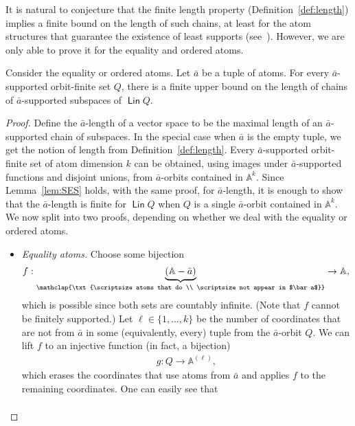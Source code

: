 \documentclass[10pt,a4paper]{amsart}
\numberwithin{equation}{section}
\newcommand{\set}[1]{\{#1\}}
\newcommand{\myunderbrace}[2]{\underbrace{#1}_{\mathclap{\txt{\scriptsize #2}}}}
\newcommand{\atoms}{\mathbb A}
\DeclareMathOperator{\lin}{\mathsf{Lin}}
\begin{document}
It is natural to conjecture that the finite length property (Definition~\ref{def:length}) implies a finite bound on the length of such chains, at least for the atom structures that guarantee the existence of least supports (see~\cite[Section 9]{BKL14}). However, we are only able to prove it for the equality and ordered atoms.


\begin{theorem}\label{cor:finsup-length}
	Consider the equality or ordered atoms. Let $\bar a$ be a tuple of atoms.  For every $\bar a$-supported orbit-finite set $Q$, there is a finite upper bound on the length of chains of $\bar a$-supported subspaces of $\lin Q$.
\end{theorem}

\begin{proof}
	Define the $\bar a$-length of a vector space to be the maximal length of an $\bar a$-supported chain of subspaces. In the special case when $\bar a$ is the empty tuple, we get the notion of length from Definition~\ref{def:length}. 
	Every $\bar a$-supported orbit-finite set of atom dimension $k$ can be obtained, using images under $\bar a$-supported functions and disjoint unions, from $\bar a$-orbits contained in $\atoms^k$. Since 
	 Lemma~\ref{lem:SES} holds, with the same proof,  for $\bar a$-length, it is enough to show that the $\bar a$-length is finite for $\lin Q$ when $Q$ is a single $\bar a$-orbit contained in $\atoms^k$. We now split into two proofs, depending on whether we deal with the equality or ordered atoms. 
	 \begin{itemize}
	 \item \emph{Equality atoms.} Choose some bijection 
	 \begin{align*}
	 f : \myunderbrace{(\atoms - \bar a)}{atoms that do  \\
	 \scriptsize not appear in $\bar a$} \to \atoms,
	 \end{align*}
	 which is possible since both sets are countably infinite. (Note that $f$ cannot be finitely supported.) Let $\ell \in \set{1,\ldots,k}$ be the number of coordinates that are not from $\bar a$ in some (equivalently, every) tuple from the $\bar a$-orbit $Q$.  We can lift $f$ to an injective function (in fact, a bijection) 
	 \begin{align*}
	 g : Q \to \atoms^{(\ell
	 )},
	 \end{align*}
	 which erases the coordinates that use atoms from $\bar a$ and applies $f$ to the remaining coordinates. One can easily see that 
	 \begin{align*}

\end{align*}
\end{itemize}
\end{proof}
\end{document}
